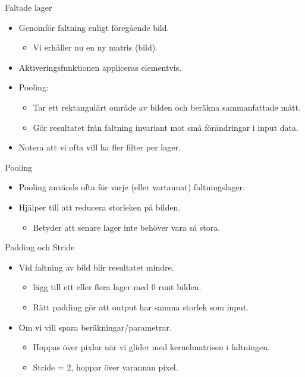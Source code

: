 \documentclass[10pt,english]{beamer}
\begin{document}
\begin{frame}{Faltade lager}
    \begin{itemize}
        \item Genomför faltning enligt föregående bild.
        \begin{itemize}
            \item Vi erhåller nu en ny matris (bild).
        \end{itemize}
        \item Aktiveringsfunktionen appliceras elementvis.
        \item Pooling:
        \begin{itemize}
            \item Tar ett rektangulärt område av bilden och beräkna sammanfattade mått.
            \item Gör resultatet från faltning invariant mot små förändringar i input data.
        \end{itemize}
        \item Notera att vi ofta vill ha fler filter per lager.
    \end{itemize}
\end{frame}

\begin{frame}{Pooling}
    
    \begin{itemize}
        \item Pooling används ofta för varje (eller vartannat) faltningslager.
        \item Hjälper till att reducera storleken på bilden.
        \begin{itemize}
            \item Betyder att senare lager inte behöver vara så stora.
        \end{itemize}
    \end{itemize}

\end{frame}

\begin{frame}{Padding och Stride}
    
    \begin{itemize}
        \item Vid faltning av bild blir resultatet mindre.
        \begin{itemize}
            \item {} lägg till ett eller flera lager med 0 runt bilden.
            \item Rätt padding gör att output har samma storlek som input.
        \end{itemize}
        \item Om vi vill spara beräkningar/parametrar.
        \begin{itemize}
            \item {} Hoppas över pixlar när vi glider med kernelmatrisen i faltningen.
            \item Stride = 2, hoppar över varannan pixel.
        \end{itemize}
    \end{itemize}

\end{frame}
\end{document}
